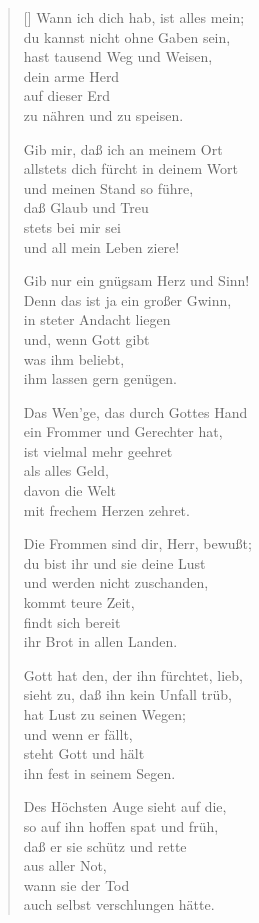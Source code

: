 \begin{multicols}{2}
\begin{verse}[\versewidth]
 Wann ich dich hab, ist alles mein;\\
du kannst nicht ohne Gaben sein,\\
hast tausend Weg und Weisen,\\
dein arme Herd\\
auf dieser Erd\\
zu nähren und zu speisen.

 Gib mir, daß ich an meinem Ort\\
allstets dich fürcht in deinem Wort\\
und meinen Stand so führe,\\
daß Glaub und Treu\\
stets bei mir sei\\
und all mein Leben ziere!

 Gib nur ein gnügsam Herz und Sinn!\\
Denn das ist ja ein großer Gwinn,\\
in steter Andacht liegen\\
und, wenn Gott gibt\\
was ihm beliebt,\\
ihm lassen gern genügen.

 Das Wen'ge, das durch Gottes Hand\\
ein Frommer und Gerechter hat,\\
ist vielmal mehr geehret\\
als alles Geld,\\
davon die Welt\\
mit frechem Herzen zehret.

 Die Frommen sind dir, Herr, bewußt;\\
du bist ihr und sie deine Lust\\
und werden nicht zuschanden,\\
kommt teure Zeit,\\
findt sich bereit\\
ihr Brot in allen Landen.

 Gott hat den, der ihn fürchtet, lieb,\\
sieht zu, daß ihn kein Unfall trüb,\\
hat Lust zu seinen Wegen;\\
und wenn er fällt,\\
steht Gott und hält\\
ihn fest in seinem Segen.

 Des Höchsten Auge sieht auf die,\\
so auf ihn hoffen spat und früh,\\
daß er sie schütz und rette\\
aus aller Not,\\
wann sie der Tod\\
auch selbst verschlungen hätte.


\end{verse}
\end{multicols}
